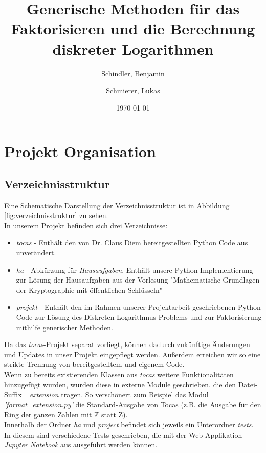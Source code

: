 \documentclass{scrartcl}
\begin{document}
\titlehead{
  Universität Leipzig \\
  Fakultät für Mathematik und Informatik \\
  Institut für Informatik
}
\subject{Projekt Dokumentation}
\title{Generische Methoden für das Faktorisieren und die Berechnung diskreter Logarithmen}
\author{Schindler, Benjamin \and Schmierer, Lukas}
\date{\today}
\publishers{Dr. Claus Diem}
\maketitle

\tableofcontents

\section{Projekt Organisation}
\label{sec:organisation}

\subsection{Verzeichnisstruktur}
\label{sec:verzeichnisstruktur}
Eine Schematische Darstellung der Verzeichnisstruktur ist in Abbildung \ref{fig:verzeichnisstruktur} zu sehen.\\
In unserem Projekt befinden sich drei Verzeichnisse:

\begin{itemize}
\item \emph{tocas} - Enthält den von Dr. Claus Diem bereitgestellten Python Code aus \cite{tocas} unverändert.

\item \emph{ha} - Abkürzung für \emph{Hausaufgaben}. Enthält unsere Python Implementierung zur Lösung der Hausaufgaben aus der Vorlesung "Mathematische Grundlagen der Kryptographie mit öffentlichen Schlüsseln"
\item \emph{projekt} - Enthält den im Rahmen unserer Projektarbeit geschriebenen Python Code zur Lösung des Diskreten Logarithmus Problems und zur Faktorisierung mithilfe generischer Methoden.
\end{itemize}
Da das \emph{tocas}-Projekt separat vorliegt, können dadurch zukünftige Änderungen und Updates in unser Projekt eingepflegt werden. Außerdem erreichen wir so eine strikte Trennung von bereitgestelltem und eigenem Code.\\
Wenn zu bereits existierenden Klassen aus \emph{tocas} weitere Funktionalitäten hinzugefügt wurden, wurden diese in externe Module geschrieben, die den Datei-Suffix \emph{\_extension} tragen. So verschönert zum Beispiel das Modul \emph{'format\_extension.py'} die Standard-Ausgabe von Tocas (z.B. die Ausgabe für den Ring der ganzen Zahlen mit \( \mathbb{Z} \) statt Z). \\
Innerhalb der Ordner \emph{ha} und \emph{project} befindet sich jeweils ein Unterordner \emph{tests}. In diesem sind verschiedene Tests geschrieben, die mit der Web-Applikation \emph{Jupyter Notebook} aus \cite{jupyterNotebook} ausgeführt werden können.
\end{document}
